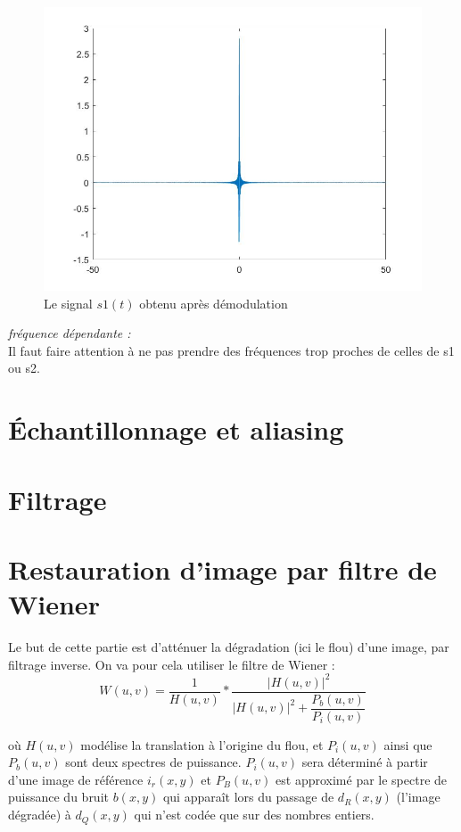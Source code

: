 \documentclass[10pt,a4paper]{article}
\begin{document}
\begin{figure}	\begin{center}
\includegraphics[scale=0.35]{s1_demodule.jpg}
\caption{Le signal $s1(t)$  obtenu après démodulation}
\label{s1demod}
\end{center}	\end{figure}



\textit{fréquence dépendante : }\\
Il faut faire attention à ne pas prendre des fréquences trop proches de celles de s1 ou s2.




\newpage

\section{Échantillonnage et aliasing	}

\section{Filtrage}

\section{Restauration d'image par filtre de Wiener}
Le but de cette partie est d'atténuer la dégradation (ici le flou) d'une image, par filtrage inverse. On va pour cela utiliser le filtre de Wiener : 
\[
	W(u,v) = \frac{1}{H(u,v)} * \frac{|H(u,v)|^2}{|H(u,v)|^2+\dfrac{P_b(u,v)}{P_i (u,v)}}	
\]

où $H(u,v)$ modélise la translation à l'origine du flou, et $P_i(u,v)$ ainsi que $P_b(u,v)$ sont deux spectres de puissance. $P_i(u,v)$ sera déterminé à partir d'une image de référence $i_r(x,y)$ et $P_B(u,v)$ est approximé par le spectre de puissance du bruit $b(x,y)$ qui apparaît lors du passage de $d_R(x,y)$ (l'image dégradée) à $d_Q(x,y)$ qui n'est codée que sur des nombres entiers.
\end{document}
